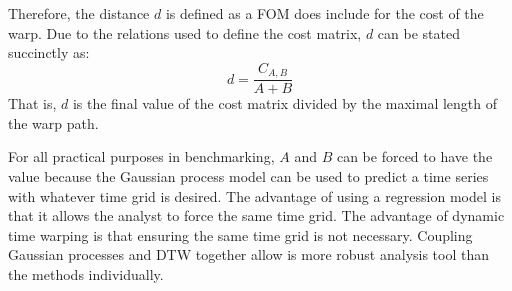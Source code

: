 Therefore, the distance $d$ is defined as a FOM does include for the cost of the
warp.  Due to the relations used to define the cost matrix, $d$ can be stated
succinctly as:
\begin{equation}
\label{d-calc}
d = \frac{C_{A,B}}{A + B}
\end{equation}
That is, $d$ is the final value of the cost matrix divided by the maximal length 
of the warp path.

For all practical purposes in benchmarking, $A$ and $B$ can be forced to have the 
value because the Gaussian process model can be used to predict a time series 
with whatever time grid is desired.  The advantage of using a regression model 
is that it allows the analyst to force the same time grid.  The advantage of 
dynamic time warping is that ensuring the same time grid is not necessary.
Coupling Gaussian processes and DTW together allow is more robust analysis tool 
than the methods individually.

